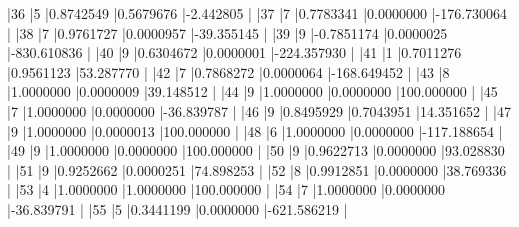 \documentclass{article}
\begin{document}
\begin{Schunk}
\begin{Soutput}
|36        |5  |0.8742549  |0.5679676 |-2.442805   |
|37        |7  |0.7783341  |0.0000000 |-176.730064 |
|38        |7  |0.9761727  |0.0000957 |-39.355145  |
|39        |9  |-0.7851174 |0.0000025 |-830.610836 |
|40        |9  |0.6304672  |0.0000001 |-224.357930 |
|41        |1  |0.7011276  |0.9561123 |53.287770   |
|42        |7  |0.7868272  |0.0000064 |-168.649452 |
|43        |8  |1.0000000  |0.0000009 |39.148512   |
|44        |9  |1.0000000  |0.0000000 |100.000000  |
|45        |7  |1.0000000  |0.0000000 |-36.839787  |
|46        |9  |0.8495929  |0.7043951 |14.351652   |
|47        |9  |1.0000000  |0.0000013 |100.000000  |
|48        |6  |1.0000000  |0.0000000 |-117.188654 |
|49        |9  |1.0000000  |0.0000000 |100.000000  |
|50        |9  |0.9622713  |0.0000000 |93.028830   |
|51        |9  |0.9252662  |0.0000251 |74.898253   |
|52        |8  |0.9912851  |0.0000000 |38.769336   |
|53        |4  |1.0000000  |1.0000000 |100.000000  |
|54        |7  |1.0000000  |0.0000000 |-36.839791  |
|55        |5  |0.3441199  |0.0000000 |-621.586219 |
\end{Soutput}
\end{Schunk}
\end{document}
